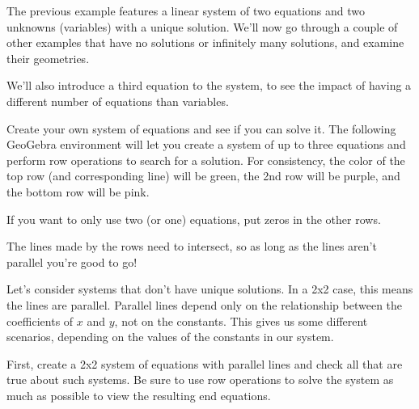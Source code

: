 \documentclass{ximera}
\begin{document}
  \begin{exploration}
    
    The previous example features a linear system of two equations and two unknowns (variables) with a unique solution. We'll now go through a couple of other examples that have no solutions or infinitely many solutions, and examine their geometries. 
    
    We'll also introduce a third equation to the system, to see the impact of having a different number of equations than variables.
    
    \begin{example}
    
        Create your own system of equations and see if you can solve it. The following GeoGebra environment will let you create a system of up to three equations and perform row operations to search for a solution. For consistency, the color of the top row (and corresponding line) will be green, the 2nd row will be purple, and the bottom row will be pink. 
    
        If you want to only use two (or one) equations, put zeros in the other rows. 
    
        \begin{center}
        \end{center}
    
        \begin{hint}
    
                The lines made by the rows need to intersect, so as long as the lines aren't parallel you're good to go!
    
        \end{hint}
    
    \end{example}
    
    \begin{example}
    
        Let's consider systems that don't have unique solutions. In a 2x2 case, this means the lines are parallel. Parallel lines depend only on the relationship between the coefficients of $x$ and $y$, not on the constants. This gives us some different scenarios, depending on the values of the constants in our system.
    
        First, create a 2x2 system of equations with parallel lines and check all that are true about such systems. Be sure to use row operations to solve the system as much as possible to view the resulting end equations.
    

\end{example}
\end{exploration}
\end{document}
